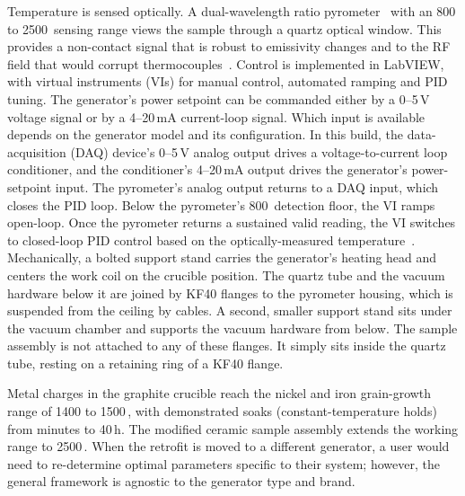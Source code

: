\documentclass[%
 aip,
 rsi,%
 amsmath,amssymb,
 reprint,%
]{revtex4-2}
\begin{document}
Temperature is sensed optically. A dual-wavelength ratio
pyrometer~\cite{tapetado2016twocolorpyrometerfor,belikov2024fastmultiwavelengthpyrometer}
with an 800 to 2500\,\celsius{} sensing range views the sample through a
quartz optical window. This provides a non-contact signal that is robust to
emissivity changes and to the RF field that would corrupt
thermocouples~\cite{ham2016insituspectralemissivity,suleiman2025improvingpyrometryof,usamentiaga2014infraredthermographyfor}.
Control is implemented in LabVIEW, with virtual instruments (VIs) for
manual control, automated
ramping and PID tuning. The generator's power setpoint can be
commanded either by a 0--5\,V voltage signal or by a 4--20\,mA current-loop
signal. Which input is available depends on the generator model and its
configuration.
In
this build, the data-acquisition (DAQ) device's 0--5\,V analog output
drives a voltage-to-current loop conditioner, and the conditioner's
4--20\,mA output drives the generator's power-setpoint input. The
pyrometer's analog output returns to a DAQ input, which closes the PID loop.
Below the pyrometer's 800\,\celsius{} detection floor, the VI
ramps open-loop. Once the pyrometer returns a sustained valid reading, the
VI switches to closed-loop PID control based on the optically-measured
temperature~\cite{meng2023designofvacuum,rapoport2006optimalcontrolof}.
Mechanically, a bolted support stand carries the generator's heating head
and centers the work coil on the crucible position. The quartz tube and the vacuum hardware below
it are joined by KF40 flanges to the pyrometer housing, which is suspended
from the ceiling by cables. A second, smaller support stand sits under the
vacuum chamber and supports the vacuum hardware from below.
The sample assembly is not attached to any of these flanges. It
simply sits inside the quartz tube, resting on a retaining ring of a KF40
flange.

Metal charges in the graphite crucible reach the nickel and iron
grain-growth range of 1400 to 1500\,\celsius, with demonstrated soaks
(constant-temperature holds) from minutes to 40\,h. The modified ceramic sample assembly extends the working
range to 2500\,\celsius. When the retrofit is moved to a different
generator, a user would need to re-determine optimal parameters specific to their system; however, the general framework is agnostic to the generator type and brand.
\end{document}
